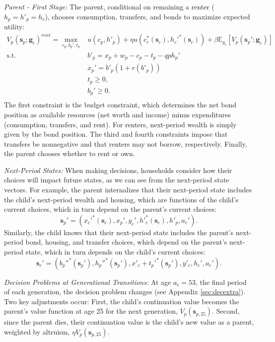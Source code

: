\documentclass[12pt]{article}
\newcommand{\E}{\mathbb{E}}
\begin{document}
\textit{Parent - First Stage:} The parent, conditional on remaining a renter ($h_p=h'_p=h_r$), chooses consumption, transfers, and bonds to maximize expected utility:
\begin{equation}\label{eq:Vp}
\begin{split}
V_p(\mathbf{s}_p;\mathbf{g}_c)^{rent} = \max_{c_p,b_p',t_p} & u(c_p,h'_p) + {\eta} u\left (c_c^*({\mathbf{s}_c}),h_c'^*({\mathbf{s}_c})\right ) + \beta \E_{y_c} \left[V_{p}({\mathbf{s}_p';\mathbf{g}_c})\right] \\
\text{s.t.}\quad & b'_p = x_p + w_p - c_p - t_p - q p h_p'\\
& x_p' = b'_p(1+r(b'_p)) \\
& t_p\ge0, \\
& b_p'\ge 0. \\
\end{split}
\end{equation}
The first constraint is the budget constraint, which determines the net bond position as available resources (net worth and income) minus expenditures (consumption, transfers, and rent). For renters, next-period wealth is simply given by the bond position. The third and fourth constraints impose that transfers be nonnegative and that renters may not borrow, respectively. Finally, the parent chooses whether to rent or own.

\textit{Next-Period States:}
When making decisions, households consider how their choices will impact future states, as we can see from the next-period state vectors. For example, the parent internalizes that their next-period state includes the child's next-period wealth and housing, which are functions of the child's current choices, which in turn depend on the parent's current choices:
\begin{equation}
	\mathbf{s}_p' = \left(x_c'^{*}({\mathbf{s}_c}),x_p',y_c',h'^*_c({\mathbf{s}_c}),h'_p,a_c'\right).
\end{equation}
Similarly, the child knows that their next-period state includes the parent's next-period bond, housing, and transfer choices, which depend on the parent's next-period state, which in turn depends on the child's current choices:
\begin{equation}
	\mathbf{s}_c' = (b_p''^*({\mathbf{s}_p'}),h_p''^*({\mathbf{s}_p'}),x'_c + t_p'^*({\mathbf{s}_p'}),y'_c,h_c',a_c').
\end{equation}


\textit{Decision Problems at Generational Transitions:}
At age $a_c=53$, the final period of each generation, the decision problem changes (see Appendix \ref{sec:decextra}). Two key adjustments occur: First, the child's continuation value becomes the parent's value function at age 25 for the next generation, $V_p(\mathbf{s}_{p,25})$. Second, since the parent dies, their continuation value is the child's new value as a parent, weighted by altruism, $\eta V_p(\mathbf{s}_{p,25})$.
\end{document}
